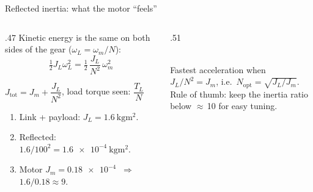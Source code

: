 \documentclass[aspectratio=169,10pt]{beamer}
\begin{document}
\begin{frame}{Reflected inertia: what the motor ``feels''}
\begin{columns}[T]
\begin{column}{.47\textwidth}
\small
Kinetic energy is the same on both sides of the gear ($\omega_L=\omega_m/N$):
\[
\tfrac12 J_L\omega_L^2=\tfrac12\,\frac{J_L}{N^2}\,\omega_m^2
\]
\begin{eqbox}
$J_\text{tot}=J_m+\dfrac{J_L}{N^2}$, \qquad load torque seen: $\dfrac{T_L}{N}$
\end{eqbox}
\begin{defbox}
\small
\begin{enumerate}\setlength\itemsep{0pt}
\item Link + payload: $J_L=\SI{1.6}{\kilo\gram\metre\squared}$.
\item Reflected: $1.6/100^2=\SI{1.6e-4}{\kilo\gram\metre\squared}$.
\item Motor $J_m=\SI{0.18e-4}{}$ $\Rightarrow$  $1.6/0.18\approx9$.
\end{enumerate}
\end{defbox}
\end{column}
\begin{column}{.51\textwidth}
\centering
{}\\
\small
Fastest acceleration when $J_L/N^2=J_m$, i.e.\ $N_\text{opt}=\sqrt{J_L/J_m}$.\\
Rule of thumb: keep the inertia ratio below $\approx$\,10 for easy tuning.
\end{column}
\end{columns}
\end{frame}
\end{document}
